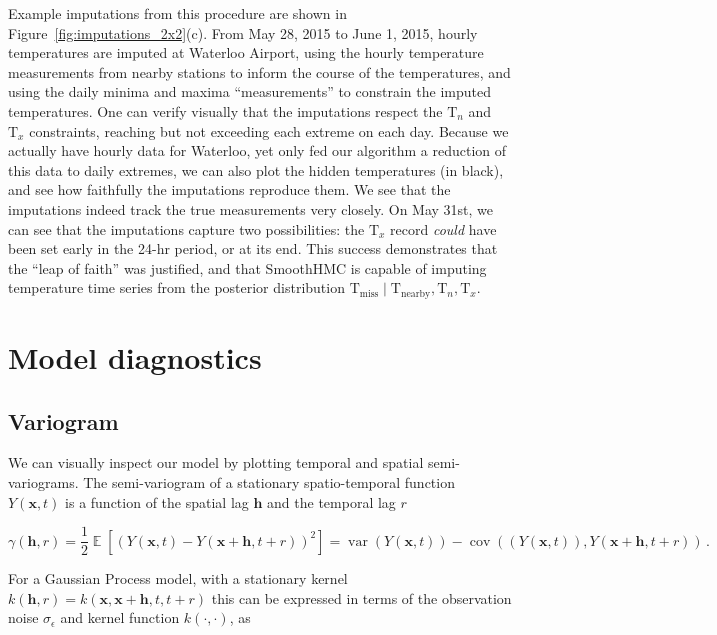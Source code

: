 \documentclass[letter]{article}
\newcommand{\genericdel}[3]{%
      \left#1#3\right#2
    }
\newcommand{\del}[1]{\genericdel(){#1}}
\newcommand{\sbr}[1]{\genericdel[]{#1}}
\DeclareMathOperator{\E}{\mathbb{E}}
\DeclareMathOperator{\cov}{{cov}}
\DeclareMathOperator{\var}{{var}}
\newcommand{\T}{\mathrm{T}}
\newcommand{\Tn}{\T_{n}}
\newcommand{\Tx}{\T_{x}}
\newcommand{\xvec}{\mathbold{x}}
\newcommand{\hvec}{\mathbold{h}}
\newcommand{\sigman}{\sigma_{\epsilon}}
\newcommand{\miss}{\mathrm{miss}}
\newcommand{\obs}{\mathrm{nearby}}
\begin{document}
        Example imputations from this procedure are shown in Figure~\ref{fig:imputations_2x2}(c).
From May 28, 2015 to June 1, 2015, hourly temperatures are imputed at Waterloo Airport, using the hourly temperature measurements from nearby stations to inform the course of the temperatures, and using the daily minima and maxima ``measurements'' to constrain the imputed temperatures.
One can verify visually that the imputations respect the \(\Tn\) and \(\Tx\) constraints, reaching but not exceeding each extreme on each day.
Because we actually have hourly data for Waterloo, yet only fed our algorithm a reduction of this data to daily extremes, we can also plot the hidden temperatures (in black), and see how faithfully the imputations reproduce them.
We see that the imputations indeed track the true measurements very closely.
On May 31st, we can see that the imputations capture two possibilities: the \(\Tx\) record \emph{could} have been set early in the 24-hr period, or at its end.
This success demonstrates that the ``leap of faith'' was justified, and that SmoothHMC is capable of imputing temperature time series from the posterior distribution \(\T_\miss \mid \T_\obs, \Tn, \Tx\).
    


        \section{Model diagnostics}\label{model-diagnostics}

\subsection{Variogram}\label{variogram}

We can visually inspect our model by plotting temporal and spatial semi-variograms. The semi-variogram of a stationary spatio-temporal function \(Y(\xvec,t)\) is a function of the spatial lag \(\hvec\) and the temporal lag \(r\)

\begin{equation}
    \gamma\del{\hvec,r} = \frac{1}{2} \E\sbr{\del{Y\del{\xvec,t}-Y\del{\xvec+\hvec,t+r}}^2} = \var\del{ Y\del{\xvec,t}} - \cov\del{ \del{Y\del{\xvec,t}} , Y\del{\xvec+\hvec,t+r}}\,.
\end{equation}

For a Gaussian Process model, with a stationary kernel \(k(\hvec,r)=k(\xvec,\xvec+\hvec,t,t+r)\) this can be expressed in terms of the observation noise \(\sigman\) and kernel function \(k(\cdot,\cdot)\), as
\end{document}
